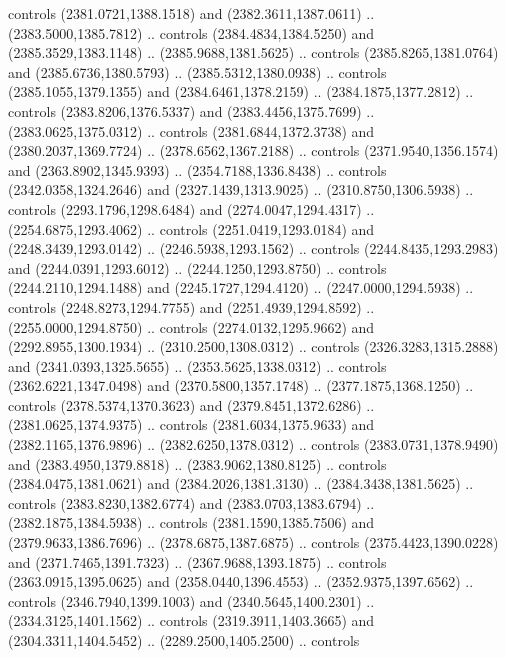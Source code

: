 \begin{scope}[shift={(19.44451,-318.97965)}]
\begin{scope}[shift={(-2093.8013,-1176.4989)}]
\begin{scope}
\begin{scope}
\begin{scope}[cm={{0.24383,0.0,0.0,0.24383,(2162.0441,1469.7571)}}]
            controls (2381.0721,1388.1518) and (2382.3611,1387.0611) ..
            (2383.5000,1385.7812) .. controls (2384.4834,1384.5250) and
            (2385.3529,1383.1148) .. (2385.9688,1381.5625) .. controls
            (2385.8265,1381.0764) and (2385.6736,1380.5793) .. (2385.5312,1380.0938) ..
            controls (2385.1055,1379.1355) and (2384.6461,1378.2159) ..
            (2384.1875,1377.2812) .. controls (2383.8206,1376.5337) and
            (2383.4456,1375.7699) .. (2383.0625,1375.0312) .. controls
            (2381.6844,1372.3738) and (2380.2037,1369.7724) .. (2378.6562,1367.2188) ..
            controls (2371.9540,1356.1574) and (2363.8902,1345.9393) ..
            (2354.7188,1336.8438) .. controls (2342.0358,1324.2646) and
            (2327.1439,1313.9025) .. (2310.8750,1306.5938) .. controls
            (2293.1796,1298.6484) and (2274.0047,1294.4317) .. (2254.6875,1293.4062) ..
            controls (2251.0419,1293.0184) and (2248.3439,1293.0142) ..
            (2246.5938,1293.1562) .. controls (2244.8435,1293.2983) and
            (2244.0391,1293.6012) .. (2244.1250,1293.8750) .. controls
            (2244.2110,1294.1488) and (2245.1727,1294.4120) .. (2247.0000,1294.5938) ..
            controls (2248.8273,1294.7755) and (2251.4939,1294.8592) ..
            (2255.0000,1294.8750) .. controls (2274.0132,1295.9662) and
            (2292.8955,1300.1934) .. (2310.2500,1308.0312) .. controls
            (2326.3283,1315.2888) and (2341.0393,1325.5655) .. (2353.5625,1338.0312) ..
            controls (2362.6221,1347.0498) and (2370.5800,1357.1748) ..
            (2377.1875,1368.1250) .. controls (2378.5374,1370.3623) and
            (2379.8451,1372.6286) .. (2381.0625,1374.9375) .. controls
            (2381.6034,1375.9633) and (2382.1165,1376.9896) .. (2382.6250,1378.0312) ..
            controls (2383.0731,1378.9490) and (2383.4950,1379.8818) ..
            (2383.9062,1380.8125) .. controls (2384.0475,1381.0621) and
            (2384.2026,1381.3130) .. (2384.3438,1381.5625) .. controls
            (2383.8230,1382.6774) and (2383.0703,1383.6794) .. (2382.1875,1384.5938) ..
            controls (2381.1590,1385.7506) and (2379.9633,1386.7696) ..
            (2378.6875,1387.6875) .. controls (2375.4423,1390.0228) and
            (2371.7465,1391.7323) .. (2367.9688,1393.1875) .. controls
            (2363.0915,1395.0625) and (2358.0440,1396.4553) .. (2352.9375,1397.6562) ..
            controls (2346.7940,1399.1003) and (2340.5645,1400.2301) ..
            (2334.3125,1401.1562) .. controls (2319.3911,1403.3665) and
            (2304.3311,1404.5452) .. (2289.2500,1405.2500) .. controls

\end{scope}
\end{scope}
\end{scope}
\end{scope}
\end{scope}
